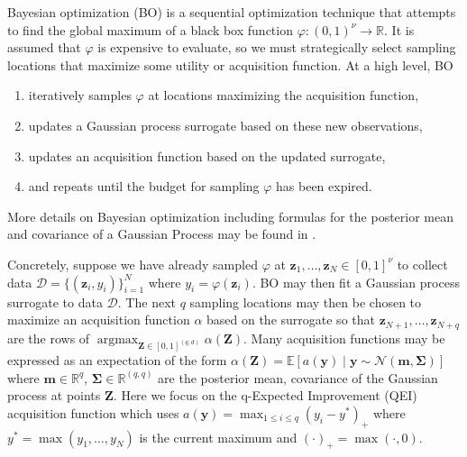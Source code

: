 \documentclass[graybox]{svmult}
\begin{document}
Bayesian optimization (BO) is a sequential optimization technique that attempts to find the global maximum of a black box function $\varphi: (0,1)^{\nu} \to \mathbb{R}$. It is assumed that $\varphi$ is expensive to evaluate, so we must strategically select sampling locations that maximize some utility or acquisition function. At a high level, BO 
\begin{enumerate}
    \item iteratively samples $\varphi$ at locations maximizing the acquisition function,
    \item updates a Gaussian process surrogate based on these new observations,
    \item updates an acquisition function based on the updated surrogate,
    \item and repeats until the budget for sampling $\varphi$ has been expired.
\end{enumerate}
More details on Bayesian optimization including formulas for the posterior mean and covariance of a Gaussian Process may be found in \cite{frazier2018tutorial}.

Concretely, suppose we have already sampled $\varphi$ at $\boldsymbol{z}_1,\dots,\boldsymbol{z}_{N} \in [0,1]^{\nu}$ to collect data $\mathcal{D}=\{(\boldsymbol{z}_i,y_i)\}_{i=1}^N$ where $y_i = \varphi(\boldsymbol{z}_i)$. BO may then fit a Gaussian process surrogate to data $\mathcal{D}$. The next $q$ sampling locations may then be chosen to maximize an acquisition function $\alpha$ based on the surrogate so that $\boldsymbol{z}_{N+1}, \dots, \boldsymbol{z}_{N+q}$ are the rows of $\mathop{\text{argmax}}_{\boldsymbol{Z} \in [0,1]^{(q,d)}}\alpha(\boldsymbol{Z})$. Many acquisition functions may be expressed as an expectation of the form $\alpha(\boldsymbol{Z}) = \mathbb{E}\left[a(\boldsymbol{y}) \mid \boldsymbol{y} \sim \mathcal{N}\left(\boldsymbol{m},\boldsymbol{\Sigma}\right)\right]$ where $\boldsymbol{m} \in \mathbb{R}^{q}$, $\boldsymbol{\Sigma} \in \mathbb{R}^{(q, q)}$ are the posterior mean, covariance of the Gaussian process at points $\boldsymbol{Z}$. Here we focus on the q-Expected Improvement (QEI) acquisition function which uses $a(\boldsymbol{y}) = \max_{1 \leq i \leq q} (y_i - y^*)_+$ where $y^*= \max\left(y_1,\dots,y_N\right)$ is the current maximum and $(\cdot)_+ = \max(\cdot,0)$. 
\end{document}

